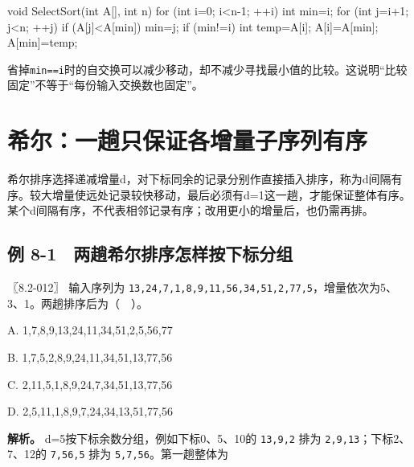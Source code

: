 \par\medskip\noindent\begin{minipage}{\linewidth}
\begin{codeblock}[language=C++]
void SelectSort(int A[], int n) {
    for (int i=0; i<n-1; ++i) {
        int min=i;
        for (int j=i+1; j<n; ++j)
            if (A[j]<A[min]) min=j;
        if (min!=i) {
            int temp=A[i]; A[i]=A[min]; A[min]=temp;
        }
    }
}
\end{codeblock}
\end{minipage}\par\medskip

省掉\texttt{min=\allowbreak{}=\allowbreak{}i}时的自交换可以减少移动，却不减少寻找最小值的比较。这说明``比较固定''不等于``每份输入交换数也固定''。

\section{希尔：一趟只保证各增量子序列有序}\label{DS08-05}

希尔排序选择递减增量d，对下标同余的记录分别作直接插入排序，称为d间隔有序。较大增量使远处记录较快移动，最后必须有d=1这一趟，才能保证整体有序。某个d间隔有序，不代表相邻记录有序；改用更小的增量后，也仍需再排。

\subsection{例 8-1　两趟希尔排序怎样按下标分组}\label{DS08-ex1}

\begin{example}[配套案例]

〖8.2-012〗 输入序列为 \texttt{13,\allowbreak{}24,\allowbreak{}7,\allowbreak{}1,\allowbreak{}8,\allowbreak{}9,\allowbreak{}11,\allowbreak{}56,\allowbreak{}34,\allowbreak{}51,\allowbreak{}2,\allowbreak{}77,\allowbreak{}5}，增量依次为5、3、1。两趟排序后为（　）。

A. 1,7,8,9,13,24,11,34,51,2,5,56,77

B. 1,7,5,2,8,9,24,11,34,51,13,77,56

C. 2,11,5,1,8,9,24,7,34,51,13,77,56

D. 2,5,11,1,8,9,7,24,34,13,51,77,56

\end{example}

\textbf{解析。} d=5按下标余数分组，例如下标0、5、10的 \texttt{13,\allowbreak{}9,\allowbreak{}2} 排为 \texttt{2,\allowbreak{}9,\allowbreak{}13}；下标2、7、12的 \texttt{7,\allowbreak{}56,\allowbreak{}5} 排为 \texttt{5,\allowbreak{}7,\allowbreak{}56}。第一趟整体为

